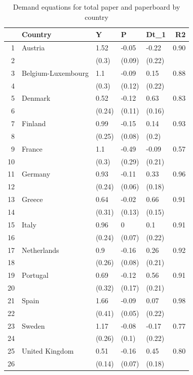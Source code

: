 \documentclass{scrartcl}\usepackage{graphicx, color}
\begin{document}
\begin{table}[ht]
\centering
\begin{tabular}{rllllr}
  \hline
 & Country & Y & P & Dt\_1 & R2 \\ 
  \hline
1 & Austria & 1.52 & -0.05 & -0.22 & 0.90 \\ 
  2 &  & (0.3) & (0.09) & (0.22) &  \\ 
  3 & Belgium-Luxembourg & 1.1 & -0.09 & 0.15 & 0.88 \\ 
  4 &  & (0.3) & (0.12) & (0.22) &  \\ 
  5 & Denmark & 0.52 & -0.12 & 0.63 & 0.83 \\ 
  6 &  & (0.24) & (0.11) & (0.16) &  \\ 
  7 & Finland & 0.99 & -0.15 & 0.14 & 0.93 \\ 
  8 &  & (0.25) & (0.08) & (0.2) &  \\ 
  9 & France & 1.1 & -0.49 & -0.09 & 0.57 \\ 
  10 &  & (0.3) & (0.29) & (0.21) &  \\ 
  11 & Germany & 0.93 & -0.11 & 0.33 & 0.96 \\ 
  12 &  & (0.24) & (0.06) & (0.18) &  \\ 
  13 & Greece & 0.64 & -0.02 & 0.66 & 0.91 \\ 
  14 &  & (0.31) & (0.13) & (0.15) &  \\ 
  15 & Italy & 0.96 & 0 & 0.1 & 0.91 \\ 
  16 &  & (0.24) & (0.07) & (0.22) &  \\ 
  17 & Netherlands & 0.9 & -0.16 & 0.26 & 0.92 \\ 
  18 &  & (0.26) & (0.08) & (0.21) &  \\ 
  19 & Portugal & 0.69 & -0.12 & 0.56 & 0.91 \\ 
  20 &  & (0.32) & (0.17) & (0.21) &  \\ 
  21 & Spain & 1.66 & -0.09 & 0.07 & 0.98 \\ 
  22 &  & (0.41) & (0.05) & (0.22) &  \\ 
  23 & Sweden & 1.17 & -0.08 & -0.17 & 0.77 \\ 
  24 &  & (0.26) & (0.1) & (0.22) &  \\ 
  25 & United Kingdom & 0.51 & -0.16 & 0.45 & 0.80 \\ 
  26 &  & (0.14) & (0.07) & (0.18) &  \\ 
   \hline
\end{tabular}
\caption{Demand equations for total paper and paperboard by country} 
\label{DemandByCountry}
\end{table}
\end{document}
